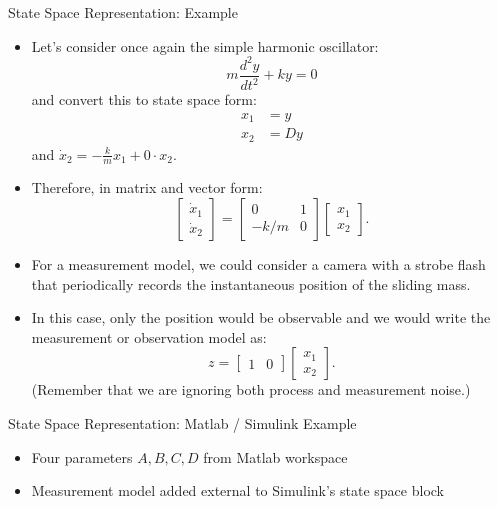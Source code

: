 \begin{frame}
State Space Representation: Example
 \begin{itemize}
 \item Let's consider once again the simple harmonic oscillator:
 \[m\frac{d^2y}{dt^2}+ky=0\]
 and convert this to state space form:
\begin{align*}
  x_1 & =y \\
  x_2 & =Dy
\end{align*}
and $\dot{x}_2 = - \frac{k}{m}x_1+ 0\cdot x_2 $.
 \item Therefore, in matrix and vector form:
 \[
 \begin{bmatrix}
 \dot{x}_1\\
 \dot{x}_2
 \end{bmatrix}
 =
\begin{bmatrix}
 0 & 1 \\
 -k/m & 0
 \end{bmatrix}
 \begin{bmatrix}
 x_1\\
 x_2
 \end{bmatrix}.
 \]
\end{itemize}
\end{frame}
\begin{frame}
\begin{itemize}
 \item For a measurement model, we could consider a camera with a strobe flash that periodically records the instantaneous position of the sliding mass.
 \item In this case, only the position would be observable and we would write the measurement or observation model as:
 \[
 z =
\begin{bmatrix}
 1 & 0
 \end{bmatrix}
 \begin{bmatrix}
 x_1\\
 x_2
 \end{bmatrix}.
 \]
(Remember that we are ignoring both process and measurement noise.)
\end{itemize}
\end{frame}

\begin{frame}
State Space Representation: Matlab / Simulink Example
\begin{itemize}
  \item Four parameters $A,B,C,D$ from Matlab workspace
  \item Measurement model added external to Simulink's state space block
\end{itemize} 
\end{frame}

